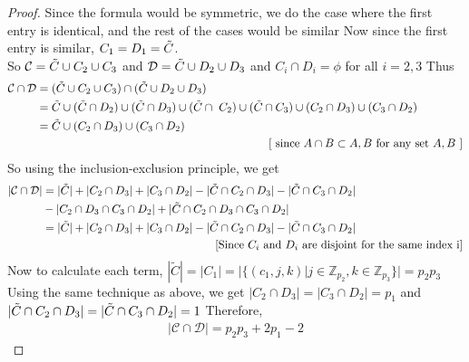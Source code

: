 \documentclass[12pt]{article}
\theoremstyle{definition}
\theoremstyle{remark}
\newcommand{\C}{\mathcal{C}}
\newcommand{\D}{\mathcal{D}}
\begin{document}
\begin{proof}
    Since the formula would be symmetric, we do the case where the first entry is identical, and the rest of the cases would be similar
    Now since the first entry is similar, $C_1=D_1=\Tilde{C}$.\\
    So $\mathcal{C}=\Tilde{C}\cup C_2\cup C_3$ and $\mathcal{D}=\Tilde{C}\cup D_2 \cup D_3$ and $C_i\cap D_i=\phi $ for all $i=2,3$
    Thus 
    \begin{align*}
        \mathcal{C}\cap\mathcal{D}&=(\Tilde{C}\cup C_2\cup C_3)\cap(\Tilde{C}\cup D_2 \cup D_3) 
        \\&=\Tilde{C} \cup (\Tilde{C} \cap D_2) \cup (\Tilde{C} \cap D_3) \cup (\Tilde{C} \cap \ C_2) \cup (\Tilde{C} \cap C_3) \cup  (C_2 \cap D_3) \cup (C_3 \cap D_2) 
        \\&= \Tilde{C} \cup (C_2 \cap D_3) \cup (C_3 \cap D_2) \\&~~~~~~~~~~~~~~~~~~~~~~~~~~~~~~~~~~~~~~~~~~~~~~~~~~~~~~~~~~~~~\text{[ since $A \cap B \subset A,B$ for any set $A,B$ ]} 
    \end{align*}
    So using the inclusion-exclusion principle, we get\begin{align*}
        |\C\cap\D|&=|\Tilde{C}| + |C_2 \cap D_3| + |C_3 \cap D_2| -|\Tilde{C} \cap C_2 \cap D_3| - |\Tilde{C} \cap C_3 \cap D_2|   \\&-|C_2 \cap D_3 \cap C_3 \cap D_2| + |\Tilde{C}\cap C_2 \cap D_3 \cap C_3 \cap D_2| 
        \\&= |\Tilde{C}| + |C_2 \cap D_3| + |C_3 \cap D_2| -|\Tilde{C} \cap C_2 \cap D_3| - |\Tilde{C} \cap C_3 \cap D_2| 
        \\& ~~~~~~~~~~~~~~~~~~~~~~~~~~~~~~~~~~~~~~~~~~~~~~\text{[Since $C_i$ and $D_i$ are disjoint for the same index i]}
    \end{align*}
    Now to calculate each term, $|\tilde{C}|=|C_1|=|\{(c_1,j,k)|j \in \mathbb{Z}_{p_2}, k \in \mathbb{Z}_{p_3}\}|=p_2p_3$
    Using the same technique as above, we get $|C_2 \cap D_3|=|C_3 \cap D_2| =p_1 $ and $|\Tilde{C} \cap C_2 \cap D_3| = |\Tilde{C} \cap C_3 \cap D_2|=1$
    Therefore,
    \begin{align*}
        |\C\cap\D|=p_2p_3+2p_1-2
    \end{align*}
\end{proof}
\end{document}
